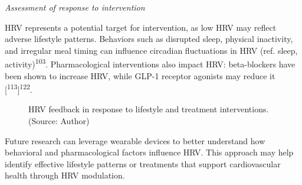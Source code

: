 \documentclass[
  a4paper,
  headsepline=true,
  open=any]{scrbook}
\begin{document}
\emph{Assessment of response to intervention}

HRV represents a potential target for intervention, as low HRV may
reflect adverse lifestyle patterns. Behaviors such as disrupted sleep,
physical inactivity, and irregular meal timing can influence circadian
fluctuations in HRV (ref. sleep, activity)\textsuperscript{103}.
Pharmacological interventions also impact HRV: beta-blockers have been
shown to increase HRV, while GLP-1 receptor agonists may reduce it
{[}\textsuperscript{113}{]}\textsuperscript{122}.

\begin{figure}

\begin{minipage}[t]{\linewidth}

{\centering 


\caption{HRV feedback in response to lifestyle and treatment
interventions. (Source: Author)}

}

\end{minipage}%

\end{figure}

Future research can leverage wearable devices to better understand how
behavioral and pharmacological factors influence HRV. This approach may
help identify effective lifestyle patterns or treatments that support
cardiovascular health through HRV modulation.
\end{document}

